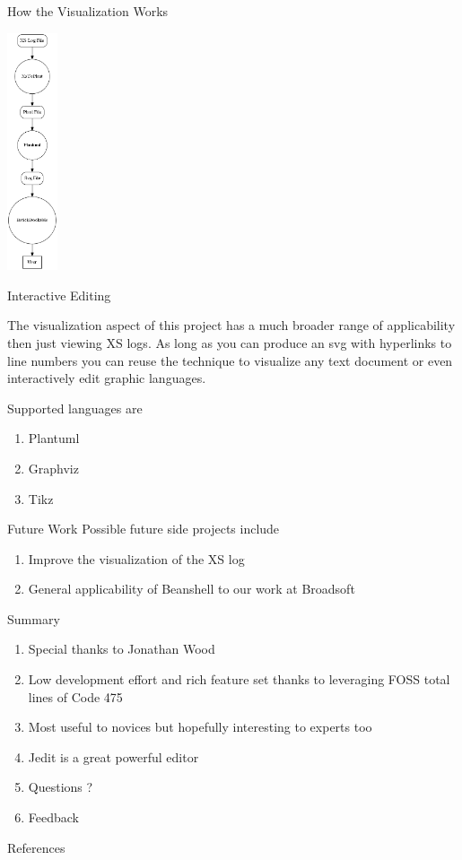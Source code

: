 \documentclass{beamer}
\begin{document}
\begin{frame}[fragile]{How the Visualization Works}
\begin{center}
\includegraphics[height=7cm]{dattflow.png}
\end{center}
\end{frame}

\begin{frame}{Interactive Editing}

The visualization aspect of this project has a much broader range of applicability then just viewing XS logs. As long as you can produce an
svg with hyperlinks to line numbers you can reuse the technique to visualize any
text document or even interactively edit graphic languages.

Supported languages are

\begin{enumerate}
\item Plantuml\cite{Plantuml}
\item Graphviz\cite{Graphviz}
\item Tikz\cite{Tikz} 
\end{enumerate}

\end{frame}



\begin{frame}{Future Work}
Possible future side projects include
\begin{enumerate}
\item Improve the visualization of the XS log 
\item General applicability of Beanshell to our work at Broadsoft
\end{enumerate}
\end{frame}


\begin{frame}{Summary}
\begin{enumerate}
\item Special thanks to Jonathan Wood
\item Low development effort and rich feature set thanks to leveraging FOSS total lines of Code 475
\item Most useful to novices but hopefully interesting to experts too
\item Jedit is a great powerful editor
\item Questions ?
\item Feedback
\end{enumerate}
\end{frame}

\begin{frame}[allowframebreaks]{References}


\end{frame}
\end{document}
